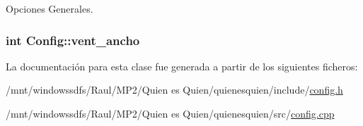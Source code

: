 Opciones Generales. 

\hypertarget{class_config_b3dd58673f2af65f7ae5d801daf8c448}{
\subsubsection[{vent\_\-ancho}]{\setlength{\rightskip}{0pt plus 5cm}int {\bf Config::vent\_\-ancho}}}
\label{class_config_b3dd58673f2af65f7ae5d801daf8c448}




La documentación para esta clase fue generada a partir de los siguientes ficheros:\begin{CompactItemize}
\item 
/mnt/windowssdfs/Raul/MP2/Quien es Quien/quienesquien/include/\hyperlink{config_8h}{config.h}\item 
/mnt/windowssdfs/Raul/MP2/Quien es Quien/quienesquien/src/\hyperlink{config_8cpp}{config.cpp}\end{CompactItemize}
